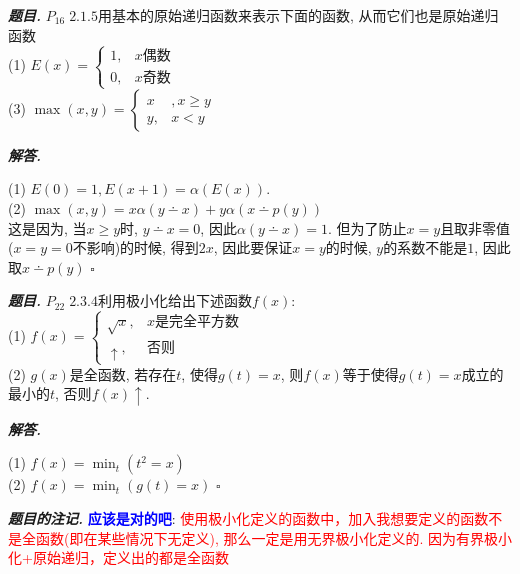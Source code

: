 \documentclass[10pt, a4paper, oneside]{ctexart}
\newenvironment{problem}{\begin{framed}\par\noindent\textbf{\textit{题目. }}}{\end{framed}\par}
\newenvironment{solution}{%
  \par\noindent\textbf{\textit{解答. }}\ignorespaces
}{%
  \hfill\ensuremath{\square}\par
}
\newenvironment{note}{\par\noindent\textbf{\textit{题目的注记. }}\ignorespaces}{\par}
\begin{document}
\begin{problem}
$P_{16}\; 2.1.5$用基本的原始递归函数来表示下面的函数, 从而它们也是原始递归函数\\
(1) $E(x)=\begin{cases}
    1, &x\text{偶数}\\
    0, &x\text{奇数}
\end{cases}$\\
(3) $\max(x,y)=\begin{cases}
    x&,x\geq y\\
    y,&x<y
\end{cases}$
\end{problem}
\begin{solution}
(1) $E(0)=1, E(x+1)=\alpha(E(x))$.\\
(2) $\max(x,y)=x\alpha(y\dotminus x)+y\alpha(x \dotminus p(y))$\\
这是因为, 当$x\geq y$时, $y\dotminus x=0$, 因此$\alpha(y\dotminus x)=1$. 但为了防止$x=y$且取非零值($x=y=0$不影响)的时候, 得到$2x$, 因此要保证$x=y$的时候, $y$的系数不能是$1$, 因此取$x\dotminus p(y)$ 
\end{solution}

\begin{problem}
$P_{22}\;2.3.4$利用极小化给出下述函数$f(x)$:\\
(1) $f(x)=\begin{cases}
    \sqrt{x}, &x\text{是完全平方数}\\
    \uparrow, &\text{否则}
\end{cases}$\\
(2) $g(x)$是全函数, 若存在$t$, 使得$g(t)=x$, 则$f(x)$等于使得$g(t)=x$成立的最小的$t$, 否则$f(x)\uparrow$.
\end{problem}
\begin{solution}
(1) $f(x)=\min_{t}(t^2=x)$\\
(2) $f(x)=\min_{t}(g(t)=x)$
\end{solution}
\begin{note}
\textbf{\textcolor{blue}{应该是对的吧}}: \textcolor{red}{使用极小化定义的函数中，加入我想要定义的函数不是全函数(即在某些情况下无定义), 那么一定是用无界极小化定义的. 因为有界极小化+原始递归，定义出的都是全函数}
\end{note}
\end{document}
